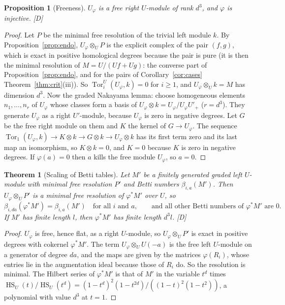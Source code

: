 \documentclass[11pt]{article}
\newtheorem{thmletter}{Theorem}
\newtheorem{proposition}{Proposition}
\theoremstyle{definition}
\theoremstyle{remark}
\newcommand{\Tor}{\operatorname{Tor}}
\newcommand{\Hilb}{\operatorname{HS}}
\begin{document}
\begin{proposition}[Freeness]\label{prop:free}
$U_\varphi$ is a free right $U$-module of rank $d^3$, and $\varphi$ is injective. [D]
\end{proposition}
\begin{proof}
Let $P$ be the minimal free resolution of the trivial left module $k$. By Proposition~\ref{prop:endo}, $U_\varphi\otimes_UP$ is the explicit complex of the pair $(f,g)$, which is exact in positive homological degrees because the pair is pure (it is then the minimal resolution of $M=U/(Uf+Ug)$: the converse part of Proposition~\ref{prop:endo}, and for the pairs of Corollary~\ref{cor:cases} Theorem~\ref{thm:crit}(iii)). So $\Tor_i^U(U_\varphi,k)=0$ for $i\ge1$, and $U_\varphi\otimes_Uk=M$ has dimension $d^3$. Now the graded Nakayama lemma: choose homogeneous elements $n_1,\dots,n_r$ of $U_\varphi$ whose classes form a basis of $U_\varphi\otimes k=U_\varphi/U_\varphi U'_+$ ($r=d^3$). They generate $U_\varphi$ as a right $U'$-module, because $U_\varphi$ is zero in negative degrees. Let $G$ be the free right module on them and $K$ the kernel of $G\to U_\varphi$. The sequence $\Tor_1(U_\varphi,k)\to K\otimes k\to G\otimes k\to U_\varphi\otimes k$ has its first term zero and its last map an isomorphism, so $K\otimes k=0$, and $K=0$ because $K$ is zero in negative degrees. If $\varphi(a)=0$ then $a$ kills the free module $U_\varphi$, so $a=0$.
\end{proof}

\begin{thmletter}[Scaling of Betti tables]\label{thm:scale}
Let $M'$ be a finitely generated graded left $U$-module with minimal free resolution $P'$ and Betti numbers $\beta_{i,a}(M')$. Then $U_\varphi\otimes_UP'$ is a minimal free resolution of $\varphi^*M'$ over $U$, so
\[
\beta_{i,da}(\varphi^*M')=\beta_{i,a}(M')\quad\text{for all }i\text{ and }a,\qquad\text{and all other Betti numbers of }\varphi^*M'\text{ are }0.
\]
If $M'$ has finite length $l$, then $\varphi^*M'$ has finite length $d^3l$. [D]
\end{thmletter}
\begin{proof}
$U_\varphi$ is free, hence flat, as a right $U$-module, so $U_\varphi\otimes_UP'$ is exact in positive degrees with cokernel $\varphi^*M'$. The term $U_\varphi\otimes_UU(-a)$ is the free left $U$-module on a generator of degree $da$, and the maps are given by the matrices $\varphi(R_i)$, whose entries lie in the augmentation ideal because those of $R_i$ do. So the resolution is minimal. The Hilbert series of $\varphi^*M'$ is that of $M'$ in the variable $t^d$ times $\Hilb_U(t)/\Hilb_U(t^d)=(1-t^d)^2(1-t^{2d})/((1-t)^2(1-t^2))$, a polynomial with value $d^3$ at $t=1$.
\end{proof}
\end{document}
